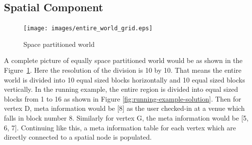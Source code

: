 


\subsection{Spatial Component}

\begin{figure}[t]
	\centering \texttt{[image: images/entire\_world\_grid.eps]}
    \caption{Space partitioned world}
    \label{fig:space-partitioned}
\end{figure}

A complete picture of equally space partitioned world would be as shown in the Figure~\ref{fig:space-partitioned}. Here the resolution of the division is 10 by 10. That means the entire world is divided into 10 equal sized blocks horizontally and 10 equal sized blocks vertically. In the running example, the entire region is divided into equal sized blocks from 1 to 16 as shown in Figure \ref{fig:running-example-solution}. Then for vertex D, meta information would be [8] as the user checked-in at a venue which falls in block number 8. Similarly for vertex G, the meta information would be [5, 6, 7]. Continuing like this, a meta information table for each vertex which are directly connected to a spatial node is populated.

